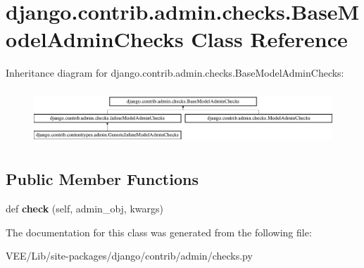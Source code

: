 \hypertarget{classdjango_1_1contrib_1_1admin_1_1checks_1_1_base_model_admin_checks}{}\section{django.\+contrib.\+admin.\+checks.\+Base\+Model\+Admin\+Checks Class Reference}
\label{classdjango_1_1contrib_1_1admin_1_1checks_1_1_base_model_admin_checks}
Inheritance diagram for django.\+contrib.\+admin.\+checks.\+Base\+Model\+Admin\+Checks\+:\begin{figure}[H]
\begin{center}
\leavevmode
\includegraphics[height=2.079208cm]{classdjango_1_1contrib_1_1admin_1_1checks_1_1_base_model_admin_checks}
\end{center}
\end{figure}
\subsection*{Public Member Functions}
\begin{DoxyCompactItemize}
\item 
\mbox{\label{classdjango_1_1contrib_1_1admin_1_1checks_1_1_base_model_admin_checks_adc4977f4f9f0250b38e45f198ab41ea8}} 
def {\bfseries check} (self, admin\+\_\+obj, kwargs)
\end{DoxyCompactItemize}


The documentation for this class was generated from the following file\+:\begin{DoxyCompactItemize}
\item 
V\+E\+E/\+Lib/site-\/packages/django/contrib/admin/checks.\+py\end{DoxyCompactItemize}
